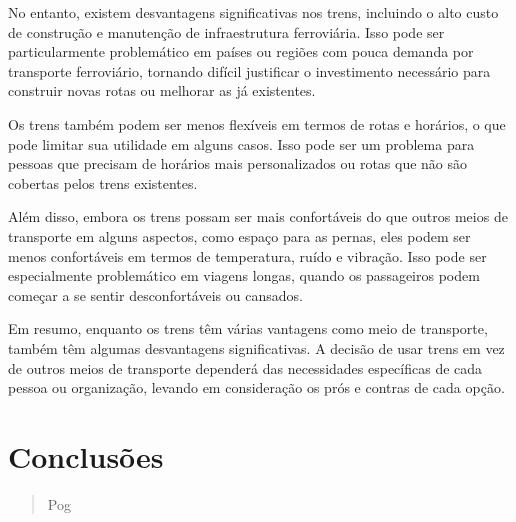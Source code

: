 \documentclass{report}
\begin{document}
No entanto, existem desvantagens significativas nos trens, incluindo o alto custo de construção e manutenção de infraestrutura ferroviária. Isso pode ser particularmente problemático em países ou regiões com pouca demanda por transporte ferroviário, tornando difícil justificar o investimento necessário para construir novas rotas ou melhorar as já existentes.

Os trens também podem ser menos flexíveis em termos de rotas e horários, o que pode limitar sua utilidade em alguns casos. Isso pode ser um problema para pessoas que precisam de horários mais personalizados ou rotas que não são cobertas pelos trens existentes.

Além disso, embora os trens possam ser mais confortáveis do que outros meios de transporte em alguns aspectos, como espaço para as pernas, eles podem ser menos confortáveis em termos de temperatura, ruído e vibração. Isso pode ser especialmente problemático em viagens longas, quando os passageiros podem começar a se sentir desconfortáveis ou cansados.

Em resumo, enquanto os trens têm várias vantagens como meio de transporte, também têm algumas desvantagens significativas. A decisão de usar trens em vez de outros meios de transporte dependerá das necessidades específicas de cada pessoa ou organização, levando em consideração os prós e contras de cada opção.
\section{Conclus\~oes}
\begin{abstract}
  Pog
\end{abstract}
\end{document}

